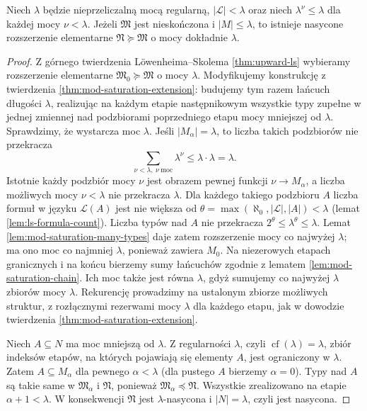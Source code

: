 \begin{twierdzenie}
\label{thm:mod-saturated-fixed-cardinality}
Niech $\lambda$ będzie nieprzeliczalną mocą regularną,
$|\mathcal L|<\lambda$ oraz niech
$\lambda^\nu\leq\lambda$ dla każdej mocy $\nu<\lambda$.
Jeżeli $\mathfrak M$ jest nieskończona i $|M|\leq\lambda$,
to istnieje nasycone rozszerzenie elementarne
$\mathfrak N\succeq\mathfrak M$ o mocy dokładnie $\lambda$.
\end{twierdzenie}
\begin{proof}
Z górnego twierdzenia Löwenheima--Skolema
\ref{thm:upward-ls} wybieramy rozszerzenie elementarne
$\mathfrak M_0\succeq\mathfrak M$ o mocy $\lambda$.
Modyfikujemy konstrukcję z twierdzenia
\ref{thm:mod-saturation-extension}: budujemy tym razem
łańcuch długości $\lambda$, realizując na każdym etapie
następnikowym wszystkie typy zupełne w jednej zmiennej
nad podzbiorami poprzedniego etapu mocy mniejszej od
$\lambda$. Sprawdzimy, że wystarcza moc $\lambda$.
Jeśli $|M_\alpha|=\lambda$, to liczba takich podzbiorów
nie przekracza
\[
\sum_{\nu<\lambda,\ \nu\ \text{moc}} \lambda^\nu
\leq\lambda\cdot\lambda=\lambda.
\]
Istotnie każdy podzbiór mocy $\nu$ jest obrazem pewnej
funkcji $\nu\to M_\alpha$, a liczba możliwych mocy
$\nu<\lambda$ nie przekracza $\lambda$.
Dla każdego takiego podzbioru $A$ liczba formuł
w języku $\mathcal L(A)$ jest nie większa od
$\theta=\max(\aleph_0,|\mathcal L|,|A|)<\lambda$
(lemat \ref{lem:ls-formula-count}).
Liczba typów nad $A$ nie przekracza
$2^\theta\leq\lambda^\theta\leq\lambda$.
Lemat \ref{lem:mod-saturation-many-types} daje zatem
rozszerzenie mocy co najwyżej $\lambda$; ma ono moc
co najmniej $\lambda$, ponieważ zawiera $M_0$.
Na niezerowych etapach granicznych i na końcu bierzemy
sumy łańcuchów zgodnie z lematem \ref{lem:mod-saturation-chain}.
Ich moc także jest równa $\lambda$, gdyż sumujemy
co najwyżej $\lambda$ zbiorów mocy $\lambda$.
Rekurencję prowadzimy na ustalonym zbiorze możliwych
struktur, z rozłącznymi rezerwami mocy $\lambda$ dla
każdego etapu, jak w dowodzie
twierdzenia \ref{thm:mod-saturation-extension}.

Niech $A\subseteq N$ ma moc mniejszą od $\lambda$.
Z regularności $\lambda$, czyli
$\operatorname{cf}(\lambda)=\lambda$, zbiór indeksów
etapów, na których pojawiają się elementy $A$, jest
ograniczony w $\lambda$. Zatem $A\subseteq M_\alpha$
dla pewnego $\alpha<\lambda$ (dla pustego $A$ bierzemy
$\alpha=0$). Typy nad $A$ są takie same w
$\mathfrak M_\alpha$ i $\mathfrak N$, ponieważ
$\mathfrak M_\alpha\preccurlyeq\mathfrak N$.
Wszystkie zrealizowano na etapie $\alpha+1<\lambda$.
W konsekwencji $\mathfrak N$ jest $\lambda$-nasycona
i $|N|=\lambda$, czyli jest nasycona.
\end{proof}

